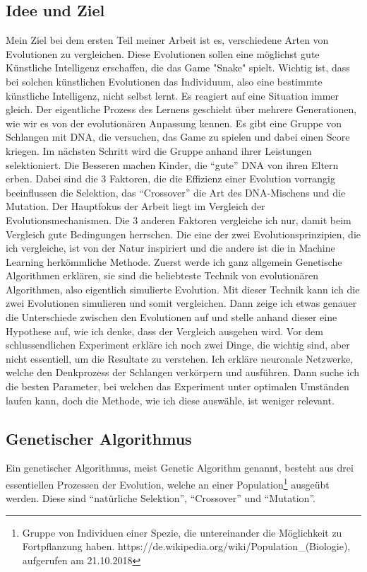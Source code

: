 \documentclass[10pt,a4paper,ngerman,english]{article}
\begin{document}
\subsection{Idee und Ziel}
Mein Ziel bei dem ersten Teil meiner Arbeit ist es, verschiedene Arten von Evolutionen zu vergleichen. Diese Evolutionen sollen eine möglichst gute Künstliche Intelligenz erschaffen, die das Game "Snake" spielt. Wichtig ist, dass bei solchen künstlichen Evolutionen das Individuum, also eine bestimmte künstliche Intelligenz, nicht selbst lernt. Es reagiert auf eine Situation immer gleich. Der eigentliche Prozess des Lernens geschieht über mehrere Generationen, wie wir es von der evolutionären Anpassung kennen. Es gibt eine Gruppe von Schlangen mit DNA, die versuchen, das Game zu spielen und dabei einen Score kriegen. Im nächsten Schritt wird die Gruppe anhand ihrer Leistungen selektioniert. Die Besseren machen Kinder, die \enquote{gute} DNA von ihren Eltern erben. Dabei sind die 3 Faktoren, die die Effizienz einer Evolution vorrangig beeinflussen die Selektion, das \enquote{Crossover} die Art des DNA-Mischens und die Mutation. Der Hauptfokus der Arbeit liegt im Vergleich der Evolutionsmechanismen. Die 3 anderen Faktoren vergleiche ich nur, damit beim Vergleich gute Bedingungen herrschen. Die eine der zwei Evolutionsprinzipien, die ich vergleiche, ist von der Natur inspiriert und die andere ist die in Machine Learning herkömmliche Methode. Zuerst werde ich ganz allgemein Genetische Algorithmen erklären, sie sind die beliebteste Technik von evolutionären Algorithmen, also eigentlich simulierte Evolution. Mit dieser Technik kann ich die zwei Evolutionen simulieren und somit vergleichen. Dann zeige ich etwas genauer die Unterschiede zwischen den Evolutionen auf und stelle anhand dieser eine Hypothese auf, wie ich denke, dass der Vergleich ausgehen wird. Vor dem schlussendlichen Experiment erkläre ich noch zwei Dinge, die wichtig sind, aber nicht essentiell, um die Resultate zu verstehen. Ich erkläre neuronale Netzwerke, welche den Denkprozess der Schlangen verkörpern und ausführen. Dann suche ich die besten Parameter, bei welchen das Experiment unter optimalen Umständen laufen kann, doch die Methode, wie ich diese auswähle, ist weniger relevant.

\subsection{Genetischer Algorithmus}

Ein genetischer Algorithmus, meist Genetic Algorithm genannt, besteht aus drei essentiellen Prozessen der Evolution, welche an einer Population\footnote{Gruppe von Individuen einer Spezie, die untereinander die Möglichkeit zu Fortpflanzung haben. https://de.wikipedia.org/wiki/Population\_(Biologie), aufgerufen am 21.10.2018} ausgeübt werden. Diese sind \enquote{natürliche Selektion}, \enquote{Crossover} und \enquote{Mutation}.\\
\end{document}
